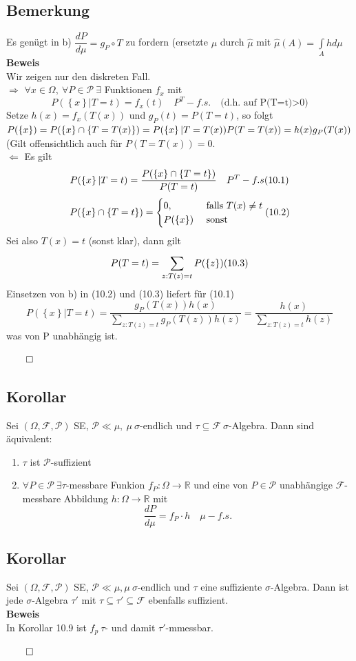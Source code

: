 \documentclass[german,10pt,oneside, fleqn, a4paper]{article}
\newcommand {\R}	{\mathbb{R}}
\newcommand{\Ra}	{\Rightarrow}
\newcommand{\La}	{\Leftarrow}
\newcommand{\ra}{\rightarrow}
\newcommand{\sm}[2][\infty]{\sum\limits_{#2}^{#1}}
\newcommand{\brac}[1]{\left\lbrace #1\right\rbrace}
\newcommand{\QED}{\begin{flushright}$\qed$\end{flushright}}
\newcommand{\mc}[1]{\mathcal{#1}}
\newcommand{\beweis}{\textbf{Beweis}\\}
\newcommand{\1}[1]{1_{#1}}
\newcommand{\2}[1]{\1{\brac{#1}}}
\newcommand{\f}{\mc{F}}
\newcommand{\p}{\mc{P}}
\begin{document}
\subsection{Bemerkung}
\label{10.8}
Es genügt in b) $\dfrac{dP}{d\mu}=g_P\circ T$ zu fordern (ersetzte $\mu$ durch $\widehat{\mu}$ mit $\widehat{\mu}(A)=\int\limits_Ahd\mu$\\
\beweis
Wir zeigen nur den diskreten Fall.\\
\glqq $\Ra$ \grqq $\forall x\in\Omega,\ \forall P\in\p\ \exists$ Funktionen $f_x$ mit \[
P(\brac{x}|T=t)=f_x(t)\quad P^T-f.s.\quad(\text{d.h. auf P(T=t)>0)}\]
Setze $h(x)=f_x(T(x))$ und $g_P(t)=P(T=t)$, so folgt \\
$P(\brac{x})=P(\brac{x}\cap\brac{T=T(x)})=P(\brac{x}|T=T(x))P(T=T(x))\\
=h(x)g_P(T(x))$\\
(Gilt offensichtlich auch für $P(T=T(x))=0$.\\
\glqq $\La$ \grqq Es gilt\\
\[P(\brac{x}|T=t)=\dfrac{P(\brac{x}\cap\brac{T=t})}{P(T=t)}\quad P^T-f.s \hfill(10.1)\]\[
P(\brac{x}\cap\brac{T=t})=\begin{cases}
0, & \text{ falls }T(x)\neq t\\
P(\brac{x}) & \text{ sonst}
\end{cases}\hfill (10.2)\]
Sei also $T(x)=t$ (sonst klar), dann gilt\[
P(T=t)=\sm[]{z:T(z)=t}P(\brac{z})\hfill(10.3)\]
Einsetzen von b) in (10.2) und (10.3) liefert für (10.1)\[
P(\brac{x}|T=t)=\dfrac{g_P(T(x))h(x)}{\sm[]{z:T(z)=t}g_P(T(z))h(z)}=\dfrac{h(x)}{\sm[]{z:T(z)=t}h(z)}\]
was von P unabhängig ist.\QED

\subsection{Korollar}
\label{10.9}
Sei $(\Omega,\f,\p)$ SE, $\p\ll\mu,\ \mu\ \sigma$-endlich und $\tau\subseteq\f\ \sigma$-Algebra. Dann sind äquivalent:\begin{enumerate}[label=(\alph*)]
\item $\tau$ ist $\p$-suffizient
\item $\forall P\in\p\ \exists \tau$-messbare Funkion $f_P:\Omega\ra\R$ und eine von $P\in\p$ unabhängige $\f$-messbare Abbildung $h:\Omega\ra\R$ mit \[\dfrac{dP}{d\mu}=f_P\cdot h\quad \mu-f.s.\]
\end{enumerate}

\subsection{Korollar}
\label{10.10}
Sei $(\Omega,\f,\p)$ SE, $\p\ll\mu, \mu\ \sigma$-endlich und $\tau$ eine suffiziente $\sigma$-Algebra. Dann ist jede $\sigma$-Algebra $\tau'$ mit $\tau\subseteq\tau'\subseteq\f$ ebenfalls suffizient.\\
\beweis
In Korollar 10.9 ist $f_p\ \tau$- und damit $\tau'$-mmessbar.\QED
\end{document}
